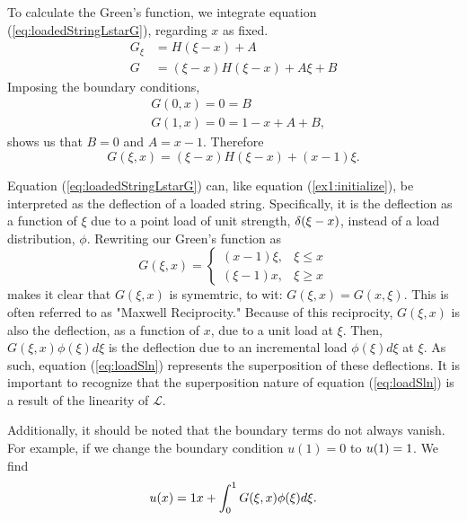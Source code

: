     To calculate the Green's function, we integrate equation (\ref{eq:loadedStringLstarG}), regarding \(x\) as fixed.
    \begin{equation}
        \begin{split}
            G_\xi &= H(\xi-x) + A\\
            G &= (\xi - x)H(\xi-x)+A\xi +B
        \end{split}
    \end{equation}
    Imposing the boundary conditions, 
    \begin{equation}
        \begin{split}
            &G(0,x) = 0 = B\\
            &G(1,x) = 0 =  1 - x + A + B,
        \end{split}
    \end{equation}
    shows us that \(B=0\) and  \(A=x-1\). Therefore
    \begin{equation}
        G(\xi,x) = (\xi-x)H(\xi-x) + (x-1)\xi.
    \end{equation}

    Equation (\ref{eq:loadedStringLstarG}) can, like equation (\ref{ex1:initialize}), be interpreted as the deflection of a loaded string. Specifically, it is the deflection as a function of \(\xi\) due to a point load of unit strength, \(\delta(\xi-x)\), instead of a load distribution, \(\phi\). Rewriting our Green's function as
    \begin{equation}
        G(\xi,x)= \begin{cases}
            (x-1)\xi, & \xi \leq x\\
            (\xi-1)x, & \xi \geq x
        \end{cases}
    \end{equation}
    makes it clear that \(G(\xi,x)\) is symemtric, to wit: \(G(\xi,x)=G(x,\xi)\). This is often referred to as "Maxwell Reciprocity." Because of this reciprocity, \(G(\xi,x)\) is also the deflection, as a function of \(x\), due to a unit load at \(\xi\). Then, \(G(\xi,x)\phi(\xi)d\xi\) is the deflection due to an incremental load \(\phi(\xi)d\xi\) at \(\xi\). As such, equation (\ref{eq:loadSln}) represents the superposition of these deflections. It is important to recognize that the superposition nature of equation (\ref{eq:loadSln}) is a result of the linearity of \(\mathcal{L}\).

    Additionally, it should be noted that the boundary terms do not always vanish. For example, if we change the boundary condition \(u(1)=0\) to \(u(1)=1\). We find
    \begin{equation*}
        u(x)=1 x + \int_{0}^{1} G(\xi,x)\phi(\xi)d\xi.
    \end{equation*}

